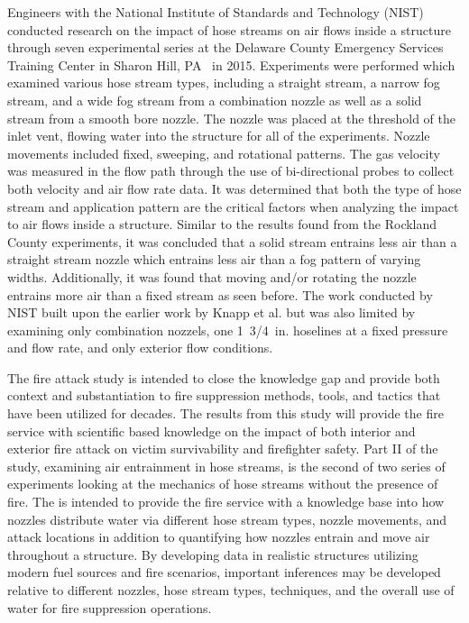 \documentclass[12pt,oneside]{book}
\begin{document}
Engineers with the National Institute of Standards and Technology (NIST) conducted research on the impact of hose streams on air flows inside a structure through seven experimental series at the Delaware County Emergency Services Training Center in Sharon Hill, PA~\cite{NISTHoseStreams} in 2015. Experiments were performed which examined various hose stream types, including a straight stream, a narrow fog stream, and a wide fog stream from a combination nozzle as well as a solid stream from a smooth bore nozzle. The nozzle was placed at the threshold of the inlet vent, flowing water into the structure for all of the experiments. Nozzle movements included fixed, sweeping, and rotational patterns. The gas velocity was measured in the flow path through the use of bi-directional probes to collect both velocity and air flow rate data. It was determined that both the type of hose stream and application pattern are the critical factors when analyzing the impact to air flows inside a structure. Similar to the results found from the Rockland County experiments, it was concluded that a solid stream entrains less air than a straight stream nozzle which entrains less air than a fog pattern of varying widths. Additionally, it was found that moving and/or rotating the nozzle entrains more air than a fixed stream as seen before. The work conducted by NIST built upon the earlier work by Knapp et al. but was also limited by examining only combination nozzels, one 1~3/4~in. hoselines at a fixed pressure and flow rate, and only exterior flow conditions.

The fire attack study is intended to close the knowledge gap and provide both context and substantiation to fire suppression methods, tools, and tactics that have been utilized for decades. The results from this study will provide the fire service with scientific based knowledge on the impact of both interior and exterior fire attack on victim survivability and firefighter safety. Part II of the study, examining air entrainment in hose streams, is the second of two series of experiments looking at the mechanics of hose streams without the presence of fire. The is intended to provide the fire service with a knowledge base into how nozzles distribute water via different hose stream types, nozzle movements, and attack locations in addition to quantifying how nozzles entrain and move air throughout a structure. By developing data in realistic structures utilizing modern fuel sources and fire scenarios, important inferences may be developed relative to different nozzles, hose stream types, techniques, and the overall use of water for fire suppression operations.
\end{document}

